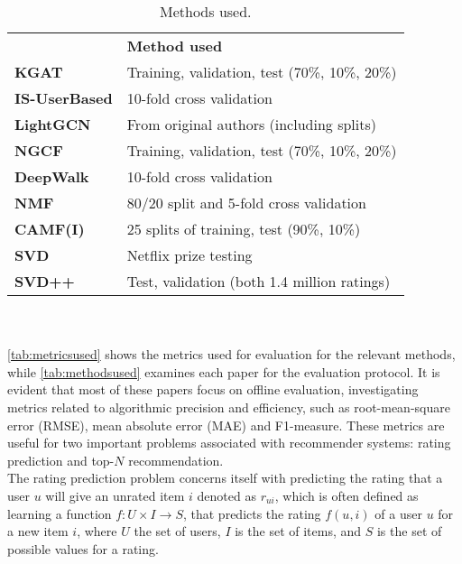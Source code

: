 \begin{table}[]\centering
    \caption{Methods used.}\label{tab:methodsused}
    \scriptsize
    \begin{tabular}{ll}\toprule
        &\textbf{Method used}\\\cmidrule{1-2}
        \textbf{KGAT\cite{KGAT}} & Training, validation, test (70\%, 10\%, 20\%) \\\cmidrule{1-2}
        \textbf{IS-UserBased\cite{GraphBasedCollaborativePaper}} & 10-fold cross validation  \\\cmidrule{1-2}
        \textbf{LightGCN\cite{LightGCN}} & From original authors (including splits) \\\cmidrule{1-2}
        \textbf{NGCF\cite{NGCF} } & Training, validation, test (70\%, 10\%, 20\%) \\\cmidrule{1-2}
        \textbf{DeepWalk\cite{DeepWalk}} & 10-fold cross validation \\\cmidrule{1-2}
        \textbf{NMF\cite{NMF} } & 80/20 split and 5-fold cross validation \\\cmidrule{1-2}
        \textbf{CAMF(I)\cite{baltrunasCAMF} } & 25 splits of training, test (90\%, 10\%) \\\cmidrule{1-2}
        \textbf{SVD\cite{standardMF} } & Netflix prize testing \\\cmidrule{1-2}
        \textbf{SVD++\cite{svd++} } & Test, validation (both 1.4 million ratings) \\\cmidrule{1-2}
    \bottomrule
    \end{tabular}
\end{table}
\\\\
\autoref{tab:metricsused} shows the metrics used for evaluation for the relevant methods, while \autoref{tab:methodsused} examines each paper for the evaluation protocol.
It is evident that most of these papers focus on offline evaluation, investigating metrics related to algorithmic precision and efficiency, such as root-mean-square error (RMSE), mean absolute error (MAE) and F1-measure.
These metrics are useful for two important problems associated with recommender systems: rating prediction and top-$N$ recommendation\cite{RecommenderHandbook2015}.
\\
The rating prediction problem concerns itself with predicting the rating that a user $u$ will give an unrated item $i$ denoted as $r_{ui}$, which is often defined as learning a function $f : U \times I \rightarrow S$, that predicts the rating $f(u, i)$ of a user $u$ for a new item $i$, where $U$ the set of users, $I$ is the set of items, and $S$ is the set of possible values for a rating.
